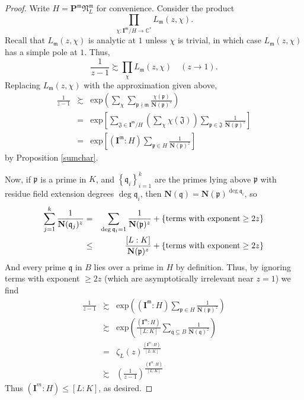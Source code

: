 \documentclass{amsart}
\def\CC{{\mathbb C}}
\def\mf{\mathfrak}
\def\CC{\mathbb{C}}   %
\def\exp{\textrm{exp}}
\def\bI{\textbf{I}}
\def\bP{\textbf{P}}
\def\bN{\textbf{N}}
\theoremstyle{definition}
\theoremstyle{remark}
\begin{document}
\begin{proof}
Write $H = \bP^\mf{m} \mf{N}^\mf{m}_L$ for convenience.  Consider
the product
\[
\prod_{\chi: \bI^\mf{m} / H \to \CC^*} L_\mf{m}(z, \chi).
\]
Recall that $L_\mf{m}(z, \chi)$ is analytic at $1$ unless $\chi$
is trivial, in which case $L_\mf{m}(z, \chi)$ has a simple pole
at $1$.  Thus,
\[
\frac{1}{z-1} \succsim \prod_{\chi} L_\mf{m}(z, \chi)  \quad (z
\to 1).
\]
Replacing $L_\mf{m}(z,\chi)$ with the approximation given above,
\begin{eqnarray*}
\frac{1}{z-1} & \succsim &  \exp\left( \sum_\chi \sum_{\mf{p}
\nmid \mf{m}} \frac{\chi(\mf{p})}{\bN(\mf{p})^z} \right) \\
& = & \exp\left[ \sum_{\mf{J} \in \bI^\mf{m} / H} \left( \sum_\chi
\chi(\mf{J}) \right) \sum_{\mf{p} \in \mf{J}}
\frac{1}{\bN(\mf{p})^z} \right] \\
& = & \exp\left[ (\bI^\mf{m} : H) \sum_{\mf{p} \in H}
\frac{1}{\bN(\mf{p})^z} \right]
\end{eqnarray*}
by Proposition \ref{sumchar}.


Now, if $\mf{p}$ is a prime in $K$, and $\left\{ \mf{q}_i
\right\}_{i=1}^k$ are the primes lying above $\mf{p}$ with
residue field extension degrees $\deg \mf{q}_i$, then $\bN(\mf{q})
= \bN(\mf{p})^{\deg \mf{q}_i}$, so
\begin{eqnarray*}
\sum_{j=1}^k \frac{1}{\bN(\mf{q}_j)^z} & = & \sum_{\deg \mf{q_j} =
1} \frac{1}{\bN(\mf{p})^z} + \left\{ \textnormal{terms with exponent} \geq 2z \right\} \\
& \leq & \frac{[L:K]}{\bN(\mf{p})^z} + \left\{ \textnormal{terms with exponent} \geq 2z \right\} \\
\end{eqnarray*}
And every prime $\mf{q}$ in $B$ lies over a prime in $H$ by
definition.  Thus, by ignoring terms with exponent $\geq 2z$
(which are asymptotically irrelevant near $z=1$) we find
\begin{eqnarray*}
\frac{1}{z-1} & \succsim & \exp\left( (\bI^\mf{m} : H)
\sum_{\mf{p} \in H}
\frac{1}{\bN(\mf{p})^z} \right) \\
& \succsim & \exp\left( \frac{(\bI^\mf{m} : H)}{[L : K]}
\sum_{\mf{q} \subseteq B}
\frac{1}{\bN(\mf{q})^z} \right) \\
& = & \zeta_L(z)^{\frac{(\bI^m : H)}{[L:K]}} \\
& \succsim & \left(\frac{1}{z-1} \right)^{\frac{(\bI^m :
H)}{[L:K]}}
\end{eqnarray*}
Thus $(\bI^m : H) \leq [L : K]$, as desired.
\end{proof}
\end{document}

